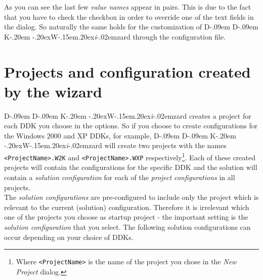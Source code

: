 \documentclass[a4paper,titlepage]{report}
\def\ddkwiz{D\kern-.09em D\kern-.09em K\kern-.20em \raise-.20ex\hbox{W}\kern-.15em\raise.20ex\hbox{\it{i}}\kern-.02em{zard}}
\begin{document}
As you can see the last few \emph{value names} appear in pairs. This is due to the
fact that you have to check the checkbox in order to override one of the
text fields in the dialog. So naturally the same holds for the customization
of \ddkwiz{} through the configuration file.

\section{Projects and configuration created by the wizard}
\ddkwiz{} creates a project for each DDK you choose in the options. So if
you choose to create configurations for the Windows 2000 and XP DDKs, for example,
\ddkwiz{} will create two projects with the names \texttt{<ProjectName>.W2K} and
\texttt{<ProjectName>.WXP} respectively\footnote{Where \texttt{<ProjectName>} is
the name of the project you chose in the \emph{New Project} dialog.}.
Each of these created projects will contain the configurations for the specific
DDK and the solution will contain a \emph{solution configuration} for each of the
\emph{project configurations} in all projects.\\

The \emph{solution configurations} are pre-configured to include only the
project which is relevant to the current (solution) configuration. Therefore it is
irrelevant which one of the projects you choose as startup project - the
important setting is the \emph{solution configuration} that you select.
The following solution configurations can occur depending on your choice
of DDKs.
\end{document}
